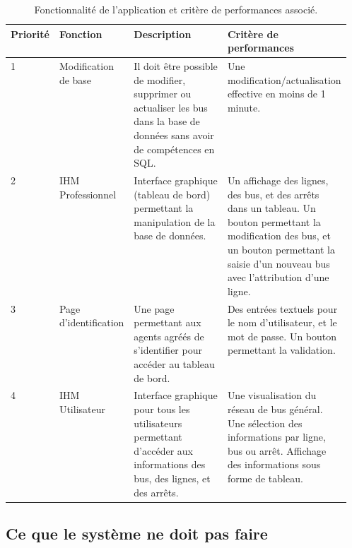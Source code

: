 \documentclass[french]{article}
\begin{document}
\begin{table}[!htbp]
\centering
\begin{tabular}{|l|l|p{0.28\linewidth}|p{0.28\linewidth}|}
\hline
\rowcolor[HTML]{D7D7D7} 
\textbf{Priorité} & \textbf{Fonction}     & \textbf{Description}                                                                                                         & \textbf{Critère de performances}                                                                                                                                                                  \\ \hline
1                 & Modification de base  & Il doit être possible de modifier, supprimer ou actualiser les bus dans la base de données sans avoir de compétences en SQL. & Une modification/actualisation effective en moins de 1 minute.                                                                                                                                    \\ \hline
2                 & IHM Professionnel     & Interface graphique (tableau de bord) permettant la manipulation de la base de données.                                      & Un affichage des lignes, des bus, et des arrêts dans un tableau. Un bouton permettant la modification des bus, et un bouton permettant la saisie d’un nouveau bus avec l’attribution d’une ligne. \\ \hline
3                 & Page d’identification & Une page permettant aux agents agréés de s’identifier pour accéder au tableau de bord.                                       & Des entrées textuels pour le nom d’utilisateur, et le mot de passe. Un bouton permettant la validation.                                                                                           \\ \hline
4                 & IHM Utilisateur       & Interface graphique pour tous les utilisateurs permettant d’accéder aux informations des bus, des lignes, et des arrêts.     & Une visualisation du réseau de bus général. Une sélection des informations par ligne, bus ou arrêt. Affichage des informations sous forme de tableau.                                             \\ \hline
\end{tabular}
\caption{Fonctionnalité de l'application et critère de performances associé.}
\end{table}

\subsection{Ce que le système ne doit pas faire}
\end{document}
